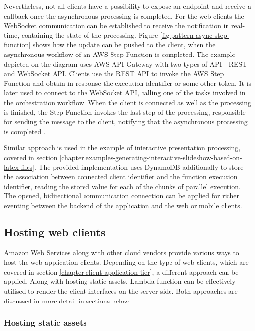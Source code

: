 Nevertheless, not all clients have a possibility to expose an endpoint and receive a callback once the asynchronous processing is completed.
For the web clients the WebSocket communication can be established to receive the notification in real-time, containing the state of the processing.
Figure \ref{fig:pattern-async-step-function} shows how the update can be pushed to the client, when the asynchronous workflow of an AWS Step Function is completed.
The example depicted on the diagram uses AWS API Gateway with two types of API - REST and WebSocket API.
Clients use the REST API to invoke the AWS Step Function and obtain in response the execution identifier or some other token.
It is later used to connect to the WebSocket API, calling one of the tasks involved in the orchestration workflow.
When the client is connected as well as the processing is finished, the Step Function invokes the last step of the processing, responsible for sending the message to the client, notifying that the asynchronous processing is completed \cite{ServerlessAtScaleDesignPatternsAndOptimizations}.

Similar approach is used in the example of interactive presentation processing, covered in section \ref{chapter:examples-generating-interactive-slideshow-based-on-latex-files}.
The provided implementation uses DynamoDB additionally to store the association between connected client identifier and the function execution identifier, reading the stored value for each of the chunks of parallel execution.
The opened, bidirectional communication connection can be applied for richer eventing between the backend of the application and the web or mobile clients.

\subsection{Hosting web clients}

Amazon Web Services along with other cloud vendors provide various ways to host the web application clients.
Depending on the type of web clients, which are covered in section \ref{chapter:client-application-tier}, a different approach can be applied.
Along with hosting static assets, Lambda function can be effectively utilised to render the client interfaces on the server side.
Both approaches are discussed in more detail in sections below.

\subsubsection{Hosting static assets}

